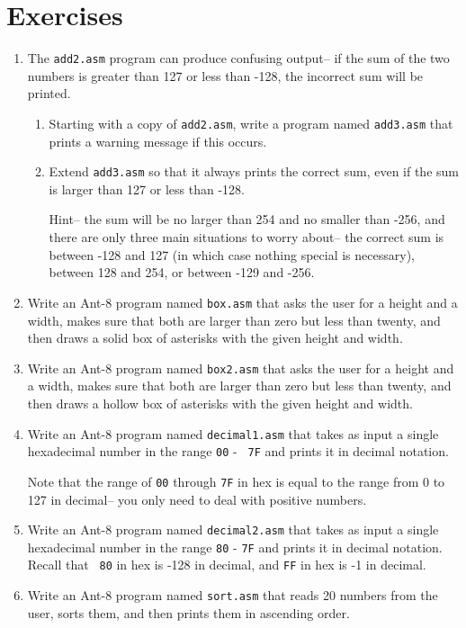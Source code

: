 
\section{Exercises}

\begin{enumerate}

\item The {\tt add2.asm} program can produce confusing output-- if the
	sum of the two numbers is greater than 127 or less than -128,
	the incorrect sum will be printed.
	
	\begin{enumerate}
	
	\item Starting with a copy of {\tt add2.asm}, write a program
		named {\tt add3.asm} that prints a warning message
		if this occurs.

	\item Extend {\tt add3.asm} so that it always prints the
		correct sum, even if the sum is larger than 127 or
		less than -128.
		
		Hint-- the sum will be no larger than 254 and no
		smaller than -256, and there are only three main
		situations to worry about-- the correct sum is between
		-128 and 127 (in which case nothing special is
		necessary), between 128 and 254, or between -129 and
		-256. 

	\end{enumerate}

\item Write an {\sc Ant-8} program named {\tt box.asm} that asks the
	user for a height and a width, makes sure that both are larger
	than zero but less than twenty, and then draws a solid box of
	asterisks with the given height and width.

\item Write an {\sc Ant-8} program named {\tt box2.asm} that asks the
	user for a height and a width, makes sure that both are larger
	than zero but less than twenty, and then draws a hollow box of
	asterisks with the given height and width.

\item Write an {\sc Ant-8} program named {\tt decimal1.asm} that takes
	as input a single hexadecimal number in the range {\tt 00} - {\tt
	7F} and prints it in decimal notation.
	
	Note that the range of {\tt 00} through {\tt 7F} in hex is
	equal to the range from 0 to 127 in decimal-- you only need to
	deal with positive numbers.

\item Write an {\sc Ant-8} program named {\tt decimal2.asm} that takes
	as input a single hexadecimal number in the range {\tt 80} -
	{\tt 7F} and prints it in decimal notation.  Recall that {\tt
	80} in hex is -128 in decimal, and {\tt FF} in hex is -1 in
	decimal.

\item Write an {\sc Ant-8} program named {\tt sort.asm} that reads 20
	numbers from the user, sorts them, and then prints them in
	ascending order.

\end{enumerate}
